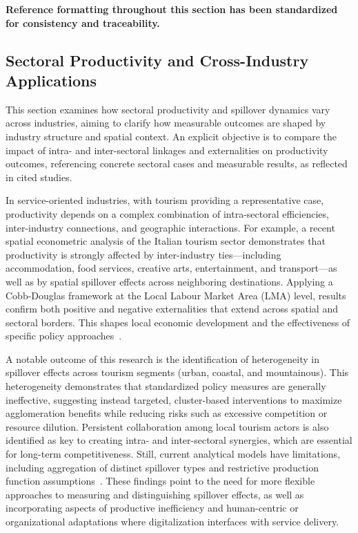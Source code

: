 \documentclass[sigconf]{acmart}
\begin{document}
\textbf{Reference formatting throughout this section has been standardized for consistency and traceability.}

\subsection{Sectoral Productivity and Cross-Industry Applications}

This section examines how sectoral productivity and spillover dynamics vary across industries, aiming to clarify how measurable outcomes are shaped by industry structure and spatial context. An explicit objective is to compare the impact of intra- and inter-sectoral linkages and externalities on productivity outcomes, referencing concrete sectoral cases and measurable results, as reflected in cited studies.

In service-oriented industries, with tourism providing a representative case, productivity depends on a complex combination of intra-sectoral efficiencies, inter-industry connections, and geographic interactions. For example, a recent spatial econometric analysis of the Italian tourism sector demonstrates that productivity is strongly affected by inter-industry ties—including accommodation, food services, creative arts, entertainment, and transport—as well as by spatial spillover effects across neighboring destinations. Applying a Cobb-Douglas framework at the Local Labour Market Area (LMA) level, results confirm both positive and negative externalities that extend across spatial and sectoral borders. This shapes local economic development and the effectiveness of specific policy approaches~\cite{ref88}.

A notable outcome of this research is the identification of heterogeneity in spillover effects across tourism segments (urban, coastal, and mountainous). This heterogeneity demonstrates that standardized policy measures are generally ineffective, suggesting instead targeted, cluster-based interventions to maximize agglomeration benefits while reducing risks such as excessive competition or resource dilution. Persistent collaboration among local tourism actors is also identified as key to creating intra- and inter-sectoral synergies, which are essential for long-term competitiveness. Still, current analytical models have limitations, including aggregation of distinct spillover types and restrictive production function assumptions~\cite{ref88}. These findings point to the need for more flexible approaches to measuring and distinguishing spillover effects, as well as incorporating aspects of productive inefficiency and human-centric or organizational adaptations where digitalization interfaces with service delivery.
\end{document}
